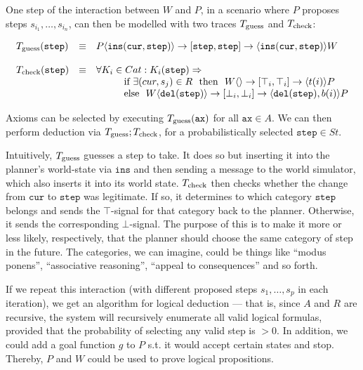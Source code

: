 \documentclass[]{scrartcl}
\theoremstyle{break}
\newcommand{\mt}[1]{\textnormal{#1}}
\renewcommand{\tt}[1]{\texttt{#1}}
\newcommand{\sendsf}[6]{#1\langle #2 \rangle \rightarrow [#3,#4] \rightarrow \langle#5\rangle#6}
\begin{document}
One step of the interaction between $W$ and $P$, in a scenario where $P$ proposes steps $s_{i_1},\dots,s_{i_n}$, can then be modelled with two traces $T_{\mt{guess}}$ and $T_{\mt{check}}$:

$$
	\begin{array}{l l l}
		T_{\mt{guess}}(\tt{step}) & \equiv & \sendsf{P}{\tt{ins}(\tt{cur}, \tt{step})}{\tt{step}}{\tt{step}}{\tt{ins}(\tt{cur}, \tt{step})}{W}\\
		\\
		T_{\mt{check}}(\tt{step}) & \equiv &
		\forall K_i \in Cat: K_i(\tt{step}) \Rightarrow\\
		
		& & \hspace{1cm} \mt{if } \exists (cur, s_j) \in R\ \mt{ then } \
					\sendsf{W}{}{\top_i}{\top_i}{t(i)}{P}\\
		& & \hspace{1cm} \mt{else }\ \sendsf{W}{\tt{del}(\tt{step})}{\bot_i}{\bot_i}{\tt{del}(\tt{step}), b(i)}{P}\\
	\end{array}
$$

\medskip

Axioms can be selected by executing $T_{\mt{guess}}(\tt{ax})$ for all $\tt{ax} \in A$. We can then perform deduction via $T_{\mt{guess}};T_{\mt{check}}$, for a probabilistically selected $\tt{step} \in St$.

Intuitively, $T_{\mt{guess}}$ guesses a step to take. It does so but inserting it into the planner's world-state via $\tt{ins}$ and then sending a message to the world simulator, which also inserts it into its world state. $T_{\mt{check}}$ then checks whether the change from $\tt{cur}$ to $\tt{step}$ was legitimate. If so, it determines to which category $\tt{step}$ belongs and sends the $\top$-signal for that category back to the planner. Otherwise, it sends the corresponding $\bot$-signal. The purpose of this is to make it more or less likely, respectively, that the planner should choose the same category of step in the future. The categories, we can imagine, could be things like ``modus ponens'', ``associative reasoning'', ``appeal to consequences'' and so forth.

If we repeat this interaction (with different proposed steps $s_1,\dots,s_p$ in each iteration), we get an algorithm for logical deduction  --- that is, since $A$ and $R$ are recursive, the system will recursively enumerate all valid logical formulas, provided that the probability of selecting any valid step is $> 0$. In addition, we could add a goal function $g$ to $P$ s.t. it would accept certain states and stop. Thereby, $P$ and $W$ could be used to prove logical propositions.
\end{document}
